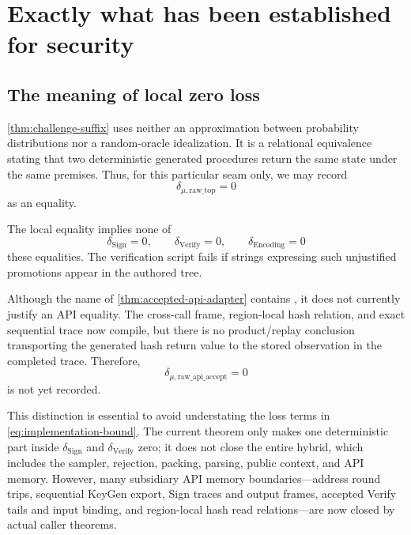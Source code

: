 \section{Exactly what has been established for security}
\label{sec:security-boundary}

\subsection{The meaning of local zero loss}

\cref{thm:challenge-suffix} uses neither an approximation between probability
distributions nor a random-oracle idealization. It is a relational equivalence
stating that two deterministic generated procedures return the same state under
the same premises. Thus, for this particular seam only, we may record
\[
  \delta_{\mu,\mathrm{raw\_top}}=0
\]
as an equality.

\begin{boundary}
\label{bdry:no-promotion}
The local equality implies none of
\[
  \delta_{\mathrm{Sign}}=0,
  \qquad
  \delta_{\mathrm{Verify}}=0,
  \qquad
  \delta_{\mathrm{Encoding}}=0
\]
these equalities. The verification script fails if strings expressing such
unjustified promotions appear in the authored tree.
\end{boundary}

Although the name of \cref{thm:accepted-api-adapter} contains
, it does not currently justify an API equality. The
cross-call frame, region-local hash relation, and exact sequential trace now
compile, but there is no product/replay conclusion transporting the generated
hash return value to the stored observation in the completed trace. Therefore,
\[
  \delta_{\mu,\mathrm{raw\_api\_accept}}=0
\]
is not yet recorded.

This distinction is essential to avoid understating the loss terms in
\cref{eq:implementation-bound}. The current theorem only makes one deterministic
part inside \(\delta_{\mathrm{Sign}}\) and \(\delta_{\mathrm{Verify}}\) zero;
it does not close the entire hybrid, which includes the sampler, rejection,
packing, parsing, public context, and API memory. However, many subsidiary API
memory boundaries---address round trips, sequential KeyGen export, Sign traces
and output frames, accepted Verify tails and input binding, and region-local
hash read relations---are now closed by actual caller theorems.

